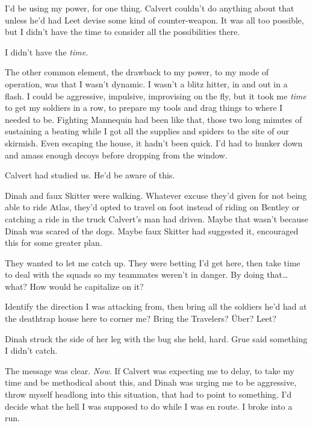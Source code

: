 I'd be using my power, for one thing.  Calvert couldn't do anything about that unless he'd had Leet devise some kind of counter-weapon.  It was all too possible, but I didn't have the time to consider all the possibilities there.



I didn't have the \emph{time}.



The other common element, the drawback to my power, to my mode of operation, was that I wasn't dynamic.  I wasn't a blitz hitter, in and out in a flash.  I could be aggressive, impulsive, improvising on the fly, but it took me \emph{time} to get my soldiers in a row, to prepare my tools and drag things to where I needed to be.  Fighting Mannequin had been like that, those two long minutes of sustaining a beating while I got all the supplies and spiders to the site of our skirmish.  Even escaping the house, it hadn't been quick.  I'd had to hunker down and amass enough decoys before dropping from the window.



Calvert had studied us.  He'd be aware of this.



Dinah and faux Skitter were walking.  Whatever excuse they'd given for not being able to ride Atlas, they'd opted to travel on foot instead of riding on Bentley or catching a ride in the truck Calvert's man had driven.  Maybe that wasn't because Dinah was scared of the dogs.  Maybe faux Skitter had suggested it, encouraged this for some greater plan.



They wanted to let me catch up.  They were betting I'd get here, then take time to deal with the squads so my teammates weren't in danger.  By doing that\ldots what?  How would he capitalize on it?



Identify the direction I was attacking from, then bring all the soldiers he'd had at the deathtrap house here to corner me?  Bring the Travelers?  \"{U}ber?  Leet?



Dinah struck the side of her leg with the bug she held, hard.  Grue said something I didn't catch.



The message was clear.  \emph{No}\emph{w}.  If Calvert was expecting me to delay, to take my time and be methodical about this, and Dinah was urging me to be aggressive, throw myself headlong into this situation, that had to point to something.  I'd decide what the hell I was supposed to do while I was en route.  I broke into a run.



